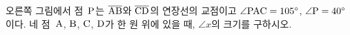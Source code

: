 \noindent\begin{minipage}[t]{0.58\linewidth}\vspace{0pt}\raggedright 오른쪽 그림에서 점~$\mathrm{P}$는 $\overline{\mathrm{AB}}$와 $\overline{\mathrm{CD}}$의 연장선의 교점이고 $\angle\mathrm{PAC}=105^\circ$, $\angle\mathrm{P}=40^\circ$이다. 네 점~$\mathrm{A}$, $\mathrm{B}$, $\mathrm{C}$, $\mathrm{D}$가 한 원 위에 있을 때, $\angle x$의 크기를 구하시오.\end{minipage}\hfill\begin{minipage}[t]{0.4\linewidth}\vspace{0pt}\centering \resizebox{\ifdim\width>\linewidth\linewidth\else\width\fi}{!}{}\end{minipage}\par

